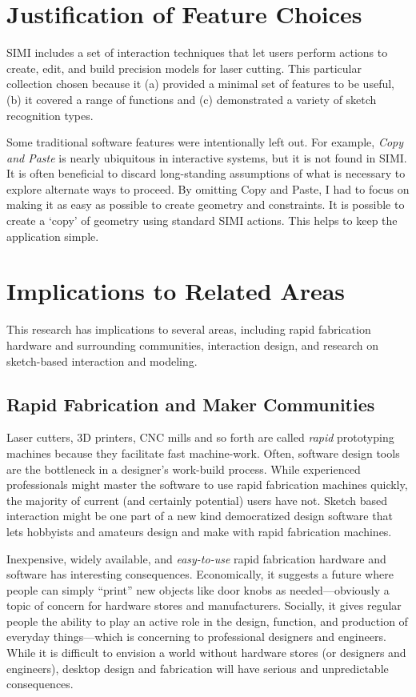 \section{Justification of Feature Choices}

SIMI includes a set of interaction techniques that let users perform
actions to create, edit, and build precision models for laser
cutting. This particular collection chosen because it (a) provided a
minimal set of features to be useful, (b) it covered a range of
functions and (c) demonstrated a variety of sketch recognition types.

Some traditional software features were intentionally left out. For
example, \textit{Copy and Paste} is nearly ubiquitous in interactive
systems, but it is not found in SIMI. It is often beneficial to
discard long-standing assumptions of what is necessary to explore
alternate ways to proceed. By omitting Copy and Paste, I had to focus
on making it as easy as possible to create geometry and
constraints. It is possible to create a `copy' of geometry using
standard SIMI actions. This helps to keep the application simple.

\section{Implications to Related Areas}

This research has implications to several areas, including rapid
fabrication hardware and surrounding communities, interaction design,
and research on sketch-based interaction and modeling.

\subsection{Rapid Fabrication and Maker Communities}

Laser cutters, 3D printers, CNC mills and so forth are called
\textit{rapid} prototyping machines because they facilitate fast
machine-work. Often, software design tools are the bottleneck in a
designer's work-build process. While experienced professionals might
master the software to use rapid fabrication machines quickly, the
majority of current (and certainly potential) users have not. Sketch
based interaction might be one part of a new kind democratized design
software that lets hobbyists and amateurs design and make with rapid
fabrication machines.

Inexpensive, widely available, and \textit{easy-to-use} rapid
fabrication hardware and software has interesting
consequences. Economically, it suggests a future where people can
simply ``print'' new objects like door knobs as needed---obviously a
topic of concern for hardware stores and manufacturers. Socially, it
gives regular people the ability to play an active role in the design,
function, and production of everyday things---which is concerning to
professional designers and engineers. While it is difficult to
envision a world without hardware stores (or designers and engineers),
desktop design and fabrication will have serious and unpredictable
consequences.

